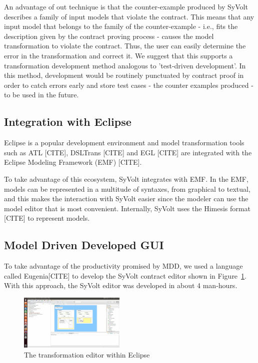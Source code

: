 An advantage of out technique is that the counter-example produced by SyVolt
describes a family of input models that violate the contract. This means that
any input model that belongs to the family of the counter-example - i.e., fits
the description given by the contract proving process - causes the model
transformation to violate the contract.  Thus, the user can easily determine the error in the
transformation and correct it. We suggest that this supports a transformation
development method analogous to 'test-driven development'. In this method,
development would be routinely punctuated by contract proof in order to catch
errors early and store test cases - the counter examples produced - to be used in the future.


\subsection{Integration with Eclipse}

Eclipse is a popular development environment and model transformation
tools such as ATL [CITE], DSLTrans [CITE] and EGL [CITE] are integrated with the
Eclipse Modeling Framework (EMF) [CITE].

To take advantage of this ecosystem, SyVolt integrates with EMF.
In the EMF, models can be represented in a multitude of syntaxes, from graphical
to textual, and this makes the interaction with SyVolt easier since the modeler
can use the model editor that is most convenient. Internally, SyVolt uses 
the Himesis format [CITE] to represent models.

\subsection{Model Driven Developed GUI}
\label{sec:mdd_gui}

To take advantage of the productivity promised by MDD, we used a language called
Eugenia[CITE] to develop the SyVolt contract editor shown in
Figure~\ref{fig:eclipse_frontend}.
With this approach, the SyVolt editor was developed in about 4 man-hours.

\begin{figure}
\centering
\includegraphics[width=0.45\textwidth]{figures/eclipse_frontend}
\caption{The transformation editor within Eclipse}
\label{fig:eclipse_frontend}
\end{figure}

